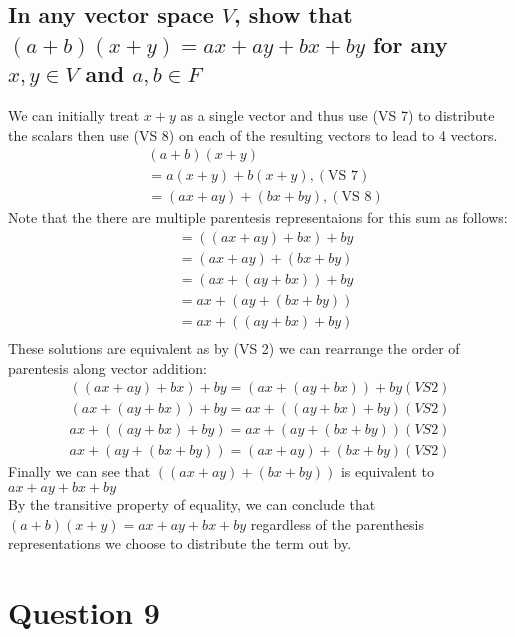 \documentclass{article}
\begin{document}
\subsection*{In any vector space $V$, show that $(a+b)(x+y) = ax + ay + bx + by$  for any $x,y \in V$ and $a,b \in F$}
We can initially treat $x+y$ as a single vector and thus use (VS 7) to distribute the scalars then use (VS 8) on each of the resulting vectors to lead to 4 vectors.\\
\begin{align*}
    & (a+b)(x+y) \\
    &= a(x+y) + b(x+y) , (\text{VS } 7 )\\
    &= (ax + ay) + (bx + by), (\text{VS } 8)
\end{align*}
Note that the there are multiple parentesis representaions for this sum as follows:
\begin{align*}
    &= ((ax + ay) + bx) + by\\
    &= (ax + ay) + (bx + by)\\
    &= (ax + (ay + bx)) + by\\
    &= ax + (ay + (bx + by))\\
    &= ax + ((ay + bx) + by)\\
\end{align*}
These solutions are equivalent as by (VS 2) we can rearrange the order of parentesis along vector addition:
\begin{align*}
    ((ax + ay) + bx) + by = (ax + (ay + bx)) + by (VS 2)\\
    (ax + (ay + bx)) + by = ax + ((ay + bx) + by) (VS 2)\\
    ax + ((ay + bx) + by) = ax + (ay + (bx + by)) (VS 2)\\
    ax + (ay + (bx + by)) = (ax + ay) + (bx + by) (VS 2)
\end{align*}
Finally we can see that $((ax + ay) + (bx + by))$  is equivalent to $ax + ay + bx + by$\\
By the transitive property of equality, we can conclude that $(a+b)(x+y) = ax + ay + bx + by$ regardless of the parenthesis representations we choose to distribute the term out by.\\



\section*{Question 9}
\end{document}
